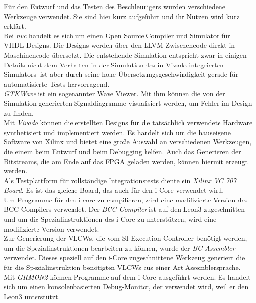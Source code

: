 Für den Entwurf und das Testen des Beschleunigers wurden verschiedene Werkzeuge verwendet.
Sie sind hier kurz aufgeführt und ihr Nutzen wird kurz erklärt. \\
Bei \textit{nvc} handelt es sich um einen Open Source Compiler und Simulator für VHDL-Designs.
Die Designs werden über den LLVM-Zwischencode direkt in Maschinencode übersetzt. Die entstehende
Simulation entspricht zwar in einigen Details nicht dem Verhalten in der Simulation des 
in Vivado integrierten Simulators, ist aber durch seine hohe Übersetzungsgeschwindigkeit
gerade für automatisierte Tests hervorragend. \\
\textit{GTKWave} ist ein sogenannter Wave Viewer. Mit ihm können die von der Simulation generierten
Signaldiagramme visualisiert werden, um Fehler im Design zu finden. \\
Mit \textit{Vivado} können die erstellten Designs für die tatsächlich verwendete Hardware synthetisiert und implementiert werden.
Es handelt sich um die hauseigene Software von Xilinx und bietet eine große Auswahl an verschiedenen Werkzeugen, die einem beim
Entwurf und beim Debugging helfen. Auch das Generieren der Bitstreams, die am Ende auf das FPGA geladen werden, können hiermit erzeugt werden. \\
Als Testplattform für vollständige Integrationstests diente ein \textit{Xilinx VC 707 Board}. Es ist das gleiche Board,
das auch für den i-Core verwendet wird. \\
Um Programme für den i-core zu compilieren, wird eine modifizierte Version des BCC-Compilers verwendet.
Der \textit{BCC-Compiler} ist auf den Leon3 zugeschnitten und um die Spezialinstruktionen des i-Core zu unterstützen,
wird eine modifizierte Version verwendet. \\
Zur Generierung der VLCWs, die vom SI Execution Controller benötigt werden, um die Spezialinstruktionen bearbeiten zu können,
wurde der \textit{BC-Assembler} verwendet. Dieses speziell auf den i-Core zugeschnittene Werkzeug generiert die 
für die Spezialinstruktion benötigten VLCWs aus einer Art Assemblersprache. \\
Mit \textit{GRMON2} können Programme auf dem i-Core ausgeführt werden. Es handelt sich um einen konsolenbasierten Debug-Monitor,
der verwendet wird, weil er den Leon3 unterstützt.
